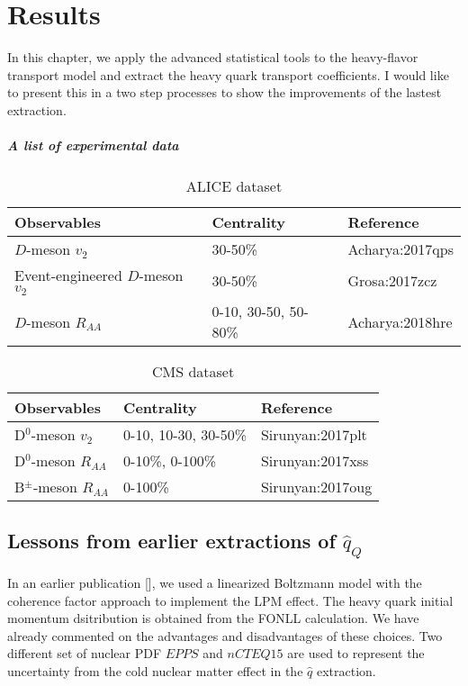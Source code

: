 \chapter{Results}
\label{chapter:results}
In this chapter, we apply the advanced statistical tools to the heavy-flavor transport model and extract the heavy quark transport coefficients.
I would like to present this in a two step processes to show the improvements of the lastest extraction.



\paragraph{A list of experimental data}
\begin{center}
\begin{table}[h]
\caption{ALICE dataset}\label{table:ALICE-obs} 
\begin{tabularx}{\columnwidth}{XXX}
\hline 
 Observables & Centrality & Reference\\ 
\hline 
$D$-meson $v_2$ & 30-50\% & {Acharya:2017qps}\\ 
\hline 
Event-engineered $D$-meson $v_2$ & 30-50\% & {Grosa:2017zcz}\\ 
\hline 
$D$-meson $R_{AA}$ & 0-10, 30-50, 50-80\% & {Acharya:2018hre}\\
\hline 
\end{tabularx}
\end{table}
\begin{table}[h]
\caption{CMS dataset}\label{table:CMS-obs} 
\begin{tabularx}{\columnwidth}{XXX}
\hline 
Observables & Centrality & Reference\\ 
\hline 
D${}^0$-meson $v_2$ & 0-10, 10-30, 30-50\% & {Sirunyan:2017plt}\\ 
\hline 
D${}^0$-meson $R_{AA}$ & 0-10\%, 0-100\% & {Sirunyan:2017xss}\\ 
\hline 
B${}^{\pm}$-meson $R_{AA}$ & 0-100\% & {Sirunyan:2017oug}\\ 
\hline 
\end{tabularx}
\end{table}
\end{center}

\section{Lessons from earlier extractions of $\hat{q}_Q$}
In an earlier publication [], we used a linearized Boltzmann model with the coherence factor approach to implement the LPM effect.
The heavy quark initial momentum dsitribution is obtained from the FONLL calculation.
We have already commented on the advantages and disadvantages of these choices.
Two different set of nuclear PDF $EPPS$ and $nCTEQ15$ are used to represent the uncertainty from the cold nuclear matter effect in the $\hat{q}$ extraction.

